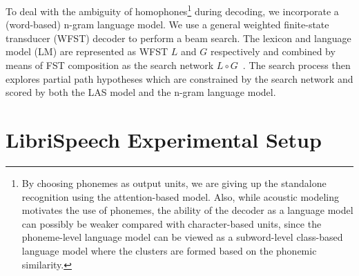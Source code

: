To deal with the ambiguity of homophones\footnote{By choosing phonemes as output units,
we are giving up the standalone recognition using the attention-based model. Also, while 
acoustic modeling motivates the use of phonemes, the ability
of the decoder as a language model can possibly be weaker compared with character-based units,
since the phoneme-level language model can be viewed as a subword-level class-based language model \cite{Brown92}
where the clusters are formed based on the phonemic similarity.}
during decoding, we incorporate a
(word-based) n-gram language model. We use a general weighted finite-state
transducer (WFST) decoder to perform a beam search. The lexicon and language
model (LM) are represented as WFST $L$ and $G$ respectively and combined by means of
FST composition as the search network $L\circ G$~\cite{mohri2008}. The search
process then explores partial path hypotheses which are constrained by the
search network and scored by both the LAS model and the n-gram language model.
\vspace{-6mm}
\section{LibriSpeech Experimental Setup}
